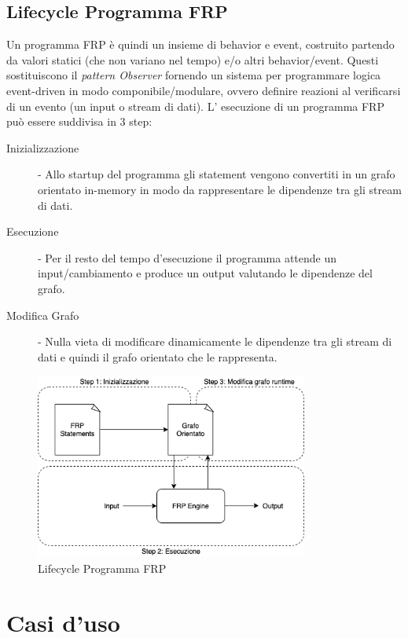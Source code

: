 \documentclass[../main.tex]{subfiles}
\begin{document}
\subsection{Lifecycle Programma FRP}
Un programma FRP è quindi un insieme di behavior e event, costruito partendo da valori statici (che non variano nel tempo) e/o altri behavior/event. Questi sostituiscono il \textit{pattern Observer} fornendo un sistema per programmare logica event-driven in modo componibile/modulare, ovvero definire reazioni al verificarsi di un evento (un input o stream di dati). L' esecuzione di un programma FRP può essere suddivisa in 3 step:
\begin{description}
    \item[Inizializzazione] - Allo startup del programma gli statement vengono convertiti in un grafo orientato in-memory in modo da rappresentare le dipendenze tra gli stream di dati.
    \item[Esecuzione] - Per il resto del tempo d'esecuzione il programma attende un input/cambiamento e produce un output valutando le dipendenze del grafo.
    \item[Modifica Grafo] - Nulla vieta di modificare dinamicamente le dipendenze tra gli stream di dati e quindi il grafo orientato che le rappresenta.
\end{description}

\begin{figure}[H]
\centering
\includegraphics[width=0.8\textwidth]{img/frp-scala1.png}
\caption{Lifecycle Programma FRP}
\end{figure}


\section{Casi d'uso}
\end{document}
